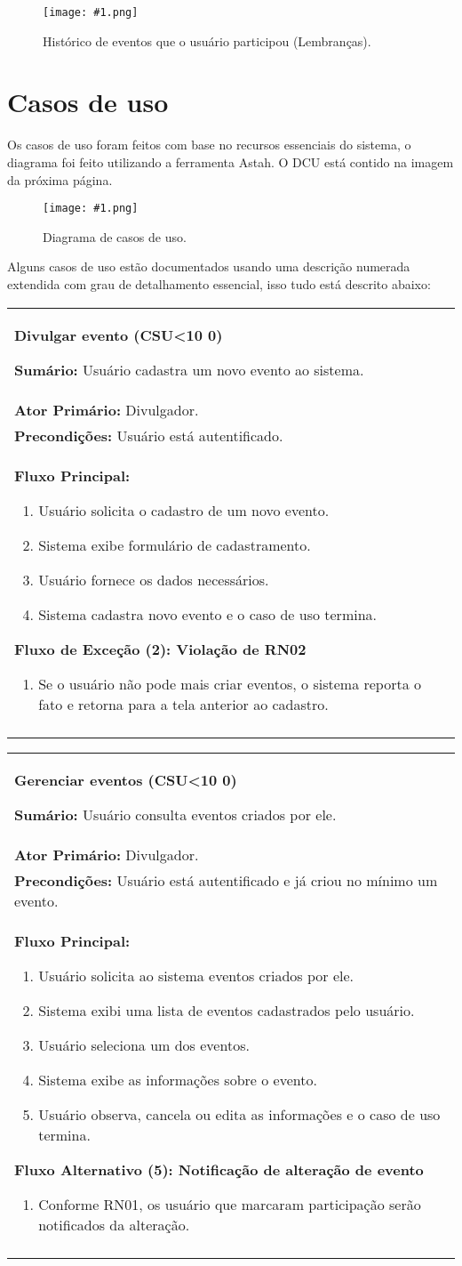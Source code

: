 \documentclass{article}
\newcounter{cscounter}
\newcommand{\sumario}[1] {\textbf{Sumário:} #1\\ }
\newcommand{\ator}[1] {\textbf{Ator Primário:} #1\\}
\newcommand{\precond}[1] {\textbf{Precondições:} #1\\}
\newcommand{\fluxo}{\textbf{Fluxo Principal:}}
\newcommand{\diagrama}[2]
{
 \begin{figure}[H]
 \begin{center}
 \texttt{[image: \#1.png]}
 \end{center}
 \caption{#2}
 \label{fig:#1}
 \end{figure}
}
\newcommand{\telasmart}[2]
{
 \begin{figure}[H]
 \begin{center}
 \texttt{[image: \#1.png]}
 \end{center}
 \caption{#2}
 \label{fig:#1}
 \end{figure}
}
\newenvironment{fluxoa}[2]
	{
		\textbf{Fluxo Alternativo (#1): #2}
		\begin{enumerate}[itemsep=0mm, label=(\alph*)]			
	}
	{
		\end{enumerate}			
	}
\newenvironment{fluxoe}[2]
	{
		\textbf{Fluxo de Exceção (#1): #2}
		\begin{enumerate}[itemsep=0mm, label=(\alph*)]			
	}
	{
		\end{enumerate}			
	}
\newenvironment{casosdeuso}[1]
{
 \stepcounter{cscounter}
 \begin{center}
 \begin{tabular}{|p{\textwidth}|}
 \hline
 \begin{center}
 \large \textbf{#1 (CSU\ifnum\value{cscounter}<10 0\fi\arabic{cscounter})}
 \end{center}
}
{ 
 \\\\\hline
 \end{tabular} 
 \end{center}
}
\begin{document}
\telasmart{hist_eventos}{Histórico de eventos que o usuário participou (Lembranças).}
 
\section{Casos de uso} \bigskip

Os casos de uso foram feitos com base no recursos essenciais do sistema, o diagrama foi feito utilizando a ferramenta Astah. O DCU está contido na imagem da próxima página.

\diagrama{usecase}{Diagrama de casos de uso.}
\pagebreak

Alguns casos de uso estão documentados usando uma descrição numerada extendida com grau de detalhamento essencial, isso tudo está descrito abaixo: 

\begin{casosdeuso}{Divulgar evento}
 \sumario{Usuário cadastra um novo evento ao sistema.}
 \ator{Divulgador.}
 \precond{Usuário está autentificado.}
\fluxo
\begin{enumerate}[itemsep=0mm]
 \item Usuário solicita o cadastro de um novo evento.
 \item Sistema exibe formulário de cadastramento.
 \item Usuário fornece os dados necessários.
 \item Sistema cadastra novo evento e o caso de uso termina.
\end{enumerate}

\begin{fluxoe}{2}{Violação de RN02} 
 \item Se o usuário não pode mais criar eventos, o sistema reporta o fato e retorna para a tela anterior ao cadastro.
\end{fluxoe}
\end{casosdeuso}

\begin{casosdeuso}{Gerenciar eventos}
 \sumario{Usuário consulta eventos criados por ele.}
 \ator{Divulgador.}
 \precond{Usuário está autentificado e já criou no mínimo um evento.}
\fluxo
\begin{enumerate}[itemsep=0mm]
 \item Usuário solicita ao sistema eventos criados por ele.
 \item Sistema exibi uma lista de eventos cadastrados pelo usuário.
 \item Usuário seleciona um dos eventos.
 \item Sistema exibe as informações sobre o evento.
 \item Usuário observa, cancela ou edita as informações e o caso de uso termina.\bigskip
\end{enumerate}
\begin{fluxoa}{5}{Notificação de alteração de evento}
 \item Conforme RN01, os usuário que marcaram participação serão notificados da alteração.
\end{fluxoa}
\end{casosdeuso}
\end{document}
